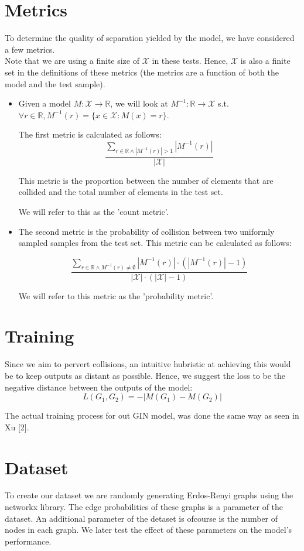 \documentclass{article}
\begin{document}
\section*{Metrics}
To determine the quality of separation yielded by the model, we have considered a few metrics.\\
Note that we are using a finite size of $\mathcal{X}$ in these tests. Hence, $\mathcal{X}$
is also a finite set in the definitions of these metrics (the metrics are a function of both the model and the test sample).
\begin{itemize}
    \item Given a model $M:\mathcal{X}\rightarrow\mathbb{R}$, 
    we will look at $M^{-1}:\mathbb{R}\rightarrow\mathcal{X}$ s.t. 
    $\forall r\in\mathbb{R}, M^{-1}(r)=\{x\in\mathcal{X}:M(x)=r\}$.

    The first metric is calculated as follows:
    \[
        \frac{\sum_{r\in\mathbb{R}\wedge |M^{-1}(r)|>1}|M^{-1}(r)|}
        {|\mathcal{X}|}
    \]

    This metric is the proportion between the number of elements 
    that are collided and the total number of elements in the test set.
    
    We will refer to this as the 'count metric'.

    \item The second metric is the probability of collision
    between two uniformly sampled samples from the test set.
    This metric can be calculated as follows:

    \[
        \frac{\sum_{r\in\mathbb{R}\wedge M^{-1}(r)\neq\emptyset}|M^{-1}(r)|\cdot\left(|M^{-1}(r)|-1\right)}
        {|\mathcal{X}|\cdot\left(|\mathcal{X}|-1\right)}
    \]

    We will refer to this metric as the 'probability metric'.
\end{itemize}


\section*{Training}
Since we aim to pervert collisions, an intuitive hubristic at achieving this would be to keep
outputs as distant as possible.
Hence, we suggest the loss to be the negative distance between the outputs of the model:
\[
    L(G_1,G_2)=-|M(G_1)-M(G_2)|    
\]

The actual training process for out GIN model, was done the same way as seen in  Xu [2].

\section*{Dataset}
To create our dataset we are randomly generating Erdos-Renyi graphs using the networkx library. The edge probabilities of
these graphs is a parameter of the dataset. An additional parameter of the detaset is ofcourse is the number
of nodes in each graph. We later test the effect of these parameters on the model's performance.\\
\end{document}
